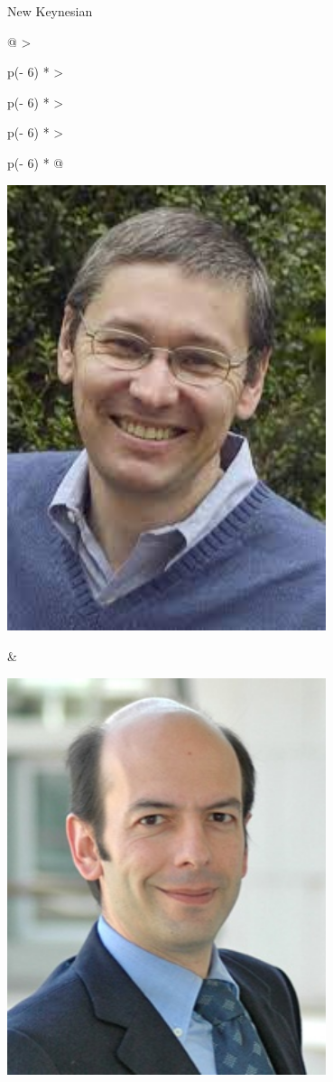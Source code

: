\begin{frame}{New Keynesian}
\protect\hypertarget{new-keynesian}{}


\begin{longtable}[]{@{}
  >{\raggedright\arraybackslash}p{(\columnwidth - 6\tabcolsep) * }
  >{\raggedright\arraybackslash}p{(\columnwidth - 6\tabcolsep) * }
  >{\raggedright\arraybackslash}p{(\columnwidth - 6\tabcolsep) * }
  >{\raggedright\arraybackslash}p{(\columnwidth - 6\tabcolsep) * }@{}}
\toprule\noalign{}
\begin{minipage}[b]{\linewidth}\raggedright
\includegraphics[width=0.7\textwidth,height=\textheight]{assets/mankiw.jpeg}
\end{minipage} & \begin{minipage}[b]{\linewidth}\raggedright
\includegraphics[width=0.7\textwidth,height=\textheight]{assets/gali.jpg}

\end{minipage}
\end{longtable}
\end{frame}
